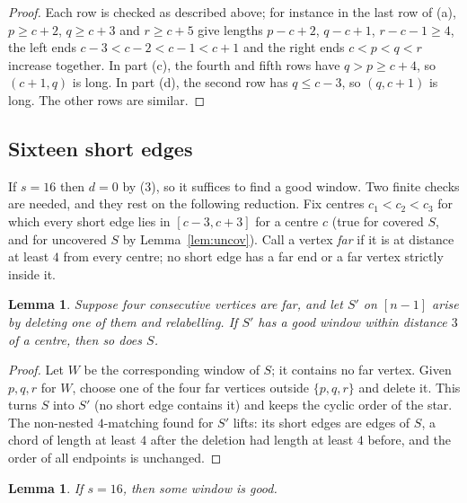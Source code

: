 \documentclass[11pt]{amsart}
\newtheorem{lemma}[theorem]{Lemma}
\theoremstyle{definition}\newtheorem{problem}{Problem}
\theoremstyle{remark}\newtheorem*{remark}{Remark}
\begin{document}
\begin{proof}
Each row is checked as described above; for instance in the last row of (a), $p\ge c+2$, $q\ge c+3$ and $r\ge c+5$
give lengths $p-c+2$, $q-c+1$, $r-c-1\ge4$, the left ends $c-3<c-2<c-1<c+1$ and the right ends $c<p<q<r$ increase
together. In part (c), the fourth and fifth rows have $q>p\ge c+4$, so $(c+1,q)$ is long. In part (d), the second row
has $q\le c-3$, so $(q,c+1)$ is long. The other rows are similar.
\end{proof}

\subsection{Sixteen short edges}
If $s=16$ then $d=0$ by (3), so it suffices to find a good window. Two finite checks are needed, and they rest on the
following reduction. Fix centres $c_1<c_2<c_3$ for which every short edge lies in $[c-3,c+3]$ for a centre $c$ (true for
covered $S$, and for uncovered $S$ by Lemma~\ref{lem:uncov}). Call a vertex \emph{far} if it is at distance at least
$4$ from every centre; no short edge has a far end or a far vertex strictly inside it.

\begin{lemma}\label{lem:far}
Suppose four consecutive vertices are far, and let $S'$ on $[n-1]$ arise by deleting one of them and relabelling. If
$S'$ has a good window within distance $3$ of a centre, then so does $S$.
\end{lemma}

\begin{proof}
Let $W$ be the corresponding window of $S$; it contains no far vertex. Given $p,q,r$ for $W$, choose one of the four far
vertices outside $\{p,q,r\}$ and delete it. This turns $S$ into $S'$ (no short edge contains it) and keeps the cyclic
order of the star. The non-nested $4$-matching found for $S'$ lifts: its short edges are edges of $S$, a chord of length
at least $4$ after the deletion had length at least $4$ before, and the order of all endpoints is unchanged.
\end{proof}

\begin{lemma}\label{lem:sixteen}
If $s=16$, then some window is good.
\end{lemma}
\end{document}
